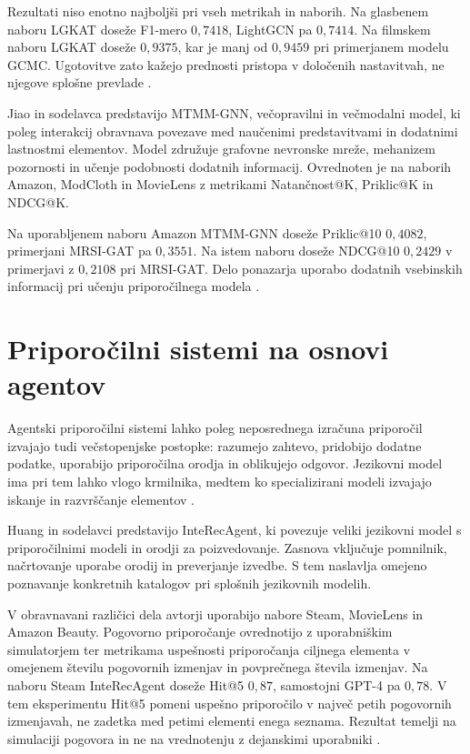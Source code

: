 \documentclass[a4paper,twoside,openright,12pt,slovene]{book}
\begin{document}
Rezultati niso enotno najboljši pri vseh metrikah
in naborih. Na glasbenem naboru LGKAT doseže
F1-mero $0{,}7418$, LightGCN pa $0{,}7414$.
Na filmskem naboru LGKAT doseže $0{,}9375$,
kar je manj od $0{,}9459$ pri primerjanem modelu GCMC.
Ugotovitve zato kažejo prednosti pristopa v določenih
nastavitvah, ne njegove splošne prevlade
\cite{hassanzadeh2025lgkat}.

Jiao in sodelavca \cite{jiao2025multitask} predstavijo
MTMM-GNN, večopravilni in večmodalni model, ki poleg
interakcij obravnava povezave med naučenimi predstavitvami
in dodatnimi lastnostmi elementov. Model združuje
grafovne nevronske mreže, mehanizem pozornosti in
učenje podobnosti dodatnih informacij.
Ovrednoten je na naborih Amazon, ModCloth in MovieLens
z metrikami Natančnost@K, Priklic@K in NDCG@K.

Na uporabljenem naboru Amazon MTMM-GNN doseže
Priklic@10 $0{,}4082$, primerjani MRSI-GAT pa
$0{,}3551$. Na istem naboru doseže NDCG@10
$0{,}2429$ v primerjavi z $0{,}2108$ pri MRSI-GAT.
Delo ponazarja uporabo dodatnih vsebinskih informacij
pri učenju priporočilnega modela
\cite{jiao2025multitask}.


\section{Priporočilni sistemi na osnovi agentov}
\label{sec:sota_agents}

Agentski priporočilni sistemi lahko poleg neposrednega
izračuna priporočil izvajajo tudi večstopenjske postopke:
razumejo zahtevo, pridobijo dodatne podatke, uporabijo
priporočilna orodja in oblikujejo odgovor.
Jezikovni model ima pri tem lahko vlogo krmilnika,
medtem ko specializirani modeli izvajajo iskanje
in razvrščanje elementov \cite{huang2024agent}.

Huang in sodelavci \cite{huang2024agent} predstavijo
InteRecAgent, ki povezuje veliki jezikovni model
s priporočilnimi modeli in orodji za poizvedovanje.
Zasnova vključuje pomnilnik, načrtovanje uporabe orodij
in preverjanje izvedbe. S tem naslavlja omejeno
poznavanje konkretnih katalogov pri splošnih
jezikovnih modelih.

V obravnavani različici dela avtorji uporabijo
nabore Steam, MovieLens in Amazon Beauty.
Pogovorno priporočanje ovrednotijo z uporabniškim
simulatorjem ter metrikama uspešnosti priporočanja
ciljnega elementa v omejenem številu pogovornih
izmenjav in povprečnega števila izmenjav.
Na naboru Steam InteRecAgent doseže Hit@5 $0{,}87$,
samostojni GPT-4 pa $0{,}78$.
V tem eksperimentu Hit@5 pomeni uspešno priporočilo
v največ petih pogovornih izmenjavah, ne zadetka
med petimi elementi enega seznama.
Rezultat temelji na simulaciji pogovora in ne na
vrednotenju z dejanskimi uporabniki
\cite{huang2024agent}.
\end{document}
